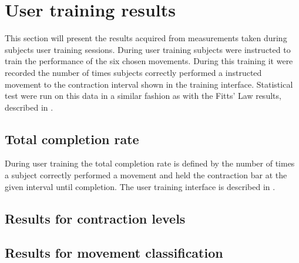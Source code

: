 
\section{User training results} \label{sec:R:userTraining}
This section will present the results acquired from measurements taken during subjects user training sessions. During user training subjects were instructed to train the performance of the six chosen movements. During this training it were recorded the number of times subjects correctly performed a instructed movement to the contraction interval shown in the training interface. Statistical test were run on this data in a similar fashion as with the Fitts' Law results, described in .  

\subsection{Total completion rate}
During user training the total completion rate is defined by the number of times a subject correctly performed a movement and held the contraction bar at the given interval until completion. The user training interface is described in . 

\subsection{Results for contraction levels}

\subsection{Results for movement classification}


